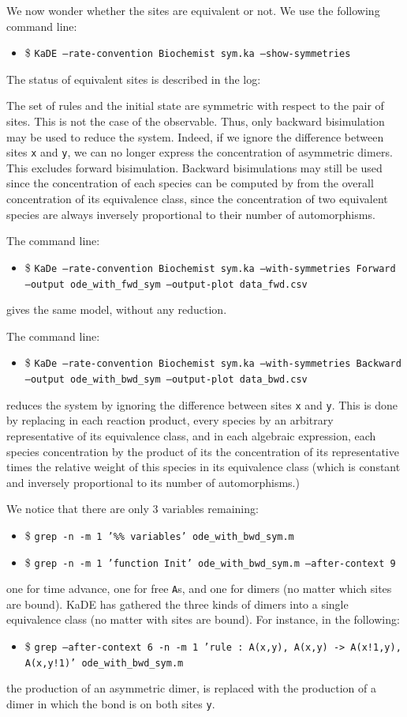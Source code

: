 \documentclass[11pt]{book}
\def\KaDE{\textsf{KaDE}}
\def\ttt#1{\texttt{#1}}
\def\ITE#1{\begin{itemize}#1\end{itemize}}
\begin{document}
We now wonder whether the sites are equivalent or not. We use the following command line:
\ITE{
\item[\$] \ttt{KaDE --rate-convention Biochemist sym.ka --show-symmetries}}
The status of equivalent sites is described in the log:


The set of rules and the initial state are symmetric with respect to the pair of sites. This is not the case of the observable. Thus, only backward bisimulation may be used to reduce the system. Indeed, if we ignore the difference between sites \texttt{x} and \texttt{y}, we can no longer express the concentration of asymmetric dimers. This  excludes forward bisimulation. Backward bisimulations may still be used since the concentration of each species can be computed by from the overall concentration of its equivalence class,  since the concentration of two equivalent species are always inversely proportional to their number of automorphisms.

The command line:
\ITE{
\item[\$] \ttt{KaDe --rate-convention Biochemist sym.ka --with-symmetries Forward --output ode\_with\_fwd\_sym --output-plot data\_fwd.csv}}
gives the same model, without any reduction.

The command line:
\ITE{
\item[\$] \ttt{KaDe --rate-convention Biochemist sym.ka --with-symmetries Backward --output ode\_with\_bwd\_sym --output-plot data\_bwd.csv}}
reduces the system by ignoring the difference between sites \texttt{x} and \texttt{y}. This is done by replacing in each reaction product, every species by an arbitrary representative of its equivalence class, and in each algebraic expression, each species concentration by the product of its the concentration of its representative times the relative weight of this species in its equivalence class (which is constant and inversely proportional to its number of automorphisms.)

We notice that there are only $3$ variables remaining:
\ITE{
\item[\$] \ttt{grep -n -m 1 '\%\% variables' ode\_with\_bwd\_sym.m}}

\ITE{
\item[\$] \ttt{grep -n -m 1 'function Init' ode\_with\_bwd\_sym.m --after-context 9 }}

one for time advance, one for free \texttt{A}{}s, and one for dimers (no matter which sites are bound). {\KaDE} has gathered the three kinds of dimers into a single equivalence class (no matter with sites are bound).  For instance, in the following:
\ITE{
\item[\$] \ttt{grep --after-context 6 -n -m 1 'rule    : A(x,y), A(x,y) -> A(x!1,y), A(x,y!1)' ode\_with\_bwd\_sym.m }}

 the production of an asymmetric dimer, is replaced with the production of a dimer in which the bond is on both sites \texttt{y}.
\end{document}
